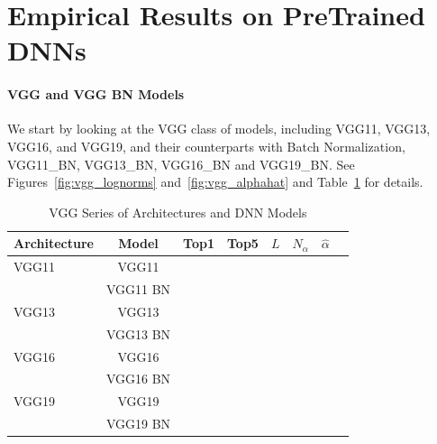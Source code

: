 \vspace{-4mm}

\section{Empirical Results on PreTrained DNNs}
\label{sxn:emp}

\paragraph{VGG and VGG BN Models}

We start by looking at the VGG class of models, including VGG11, VGG13, VGG16, and VGG19, and their counterparts with Batch Normalization, VGG11\_BN, VGG13\_BN, VGG16\_BN and VGG19\_BN.  
See Figures~\ref{fig:vgg_lognorms} and~\ref{fig:vgg_alphahat} and Table~\ref{table:models_VGG} for details.

\begin{table}[t]
\small
\begin{center}
\begin{tabular}{|p{1in}|c|c|c|c|c|c|c|}
\hline
Architecture 
 & Model &Top1 
 & Top5 & $L$ & $N_{\alpha}$ & $\hat{\alpha}$ \\
\hline
VGG11 & VGG11 & & & & & \\
  & VGG11 BN & & & & & \\
\hline
VGG13 & VGG13 & & & & & \\
  & VGG13 BN & & & & & \\
\hline
VGG16 & VGG16 & & & & & \\
  & VGG16 BN & & & & & \\
\hline
VGG19 & VGG19 & & & & & \\
  & VGG19 BN & & & & & \\
\hline
\end{tabular}
\end{center}
\caption{VGG Series of Architectures and DNN Models}
\label{table:models_VGG}
\end{table}



